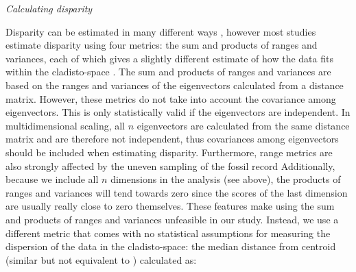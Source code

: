 \documentclass[12pt,letterpaper]{article}
\renewcommand{\subsection}[1]{%
\bigskip
\begin{center}
\begin{large}
\normalfont\itshape #1
\end{large}
\end{center}}
\begin{document}
\subsection{Calculating disparity}
Disparity can be estimated in many different ways \citep[e.g.][]{Wills1994,Ciampaglio2004,thorneresetting2011,hopkinsdecoupling2013,huang2015origins}, however most studies estimate disparity using four metrics: the sum and products of ranges and variances, each of which gives a slightly different estimate of how the data fits within the cladisto-space \citep{Foote01071994,Wills1994,brusatte50,Brusatte12092008,cisneros2010,thorneresetting2011,prentice2011,brusattedinosaur2012,toljagictriassic-jurassic2013,ruta2013,bentonmodels2014,bensonfaunal2014}.
The sum and products of ranges and variances are based on the ranges and variances of the eigenvectors calculated from a distance matrix. %
However, these metrics do not take into account the covariance among eigenvectors. %
This is only statistically valid if the eigenvectors are independent.
In multidimensional scaling, all $n$ eigenvectors are calculated from the same distance matrix and are therefore not independent, thus covariances among eigenvectors should be included when estimating disparity.
Furthermore, range metrics are also strongly affected by the uneven sampling of the fossil record \citep{Butler2012}
Additionally, because we include all $n$ dimensions in the analysis (see above), the products of ranges and variances will tend towards zero since the scores of the last dimension are usually really close to zero themselves. 
These features make using the sum and products of ranges and variances unfeasible in our study.
Instead, we use a different metric that comes with no statistical assumptions for measuring the dispersion of the data in the cladisto-space: the median distance from centroid (similar but not equivalent to \citealt{Wills1994,kornextinction2013,huang2015origins}) calculated as:
\end{document}
